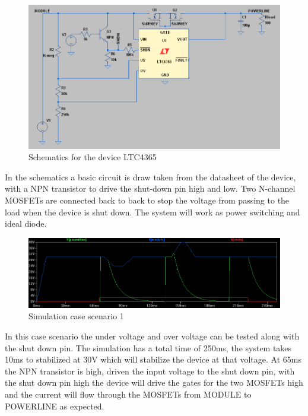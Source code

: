 \begin{figure}[H]
	\begin{centering}
		\includegraphics[width=1\textwidth]{images/tb5_LTC_simu1.png}
		\caption{Schematics for the device LTC4365}
	\end{centering}
\end{figure}
%
In the schematics a basic circuit is draw taken from the datasheet of the device, with a NPN transistor to drive the shut-down pin high and low. Two N-channel MOSFETs are connected back to back to  stop the voltage from passing to the load when the device is shut down. The system will work as power switching and ideal diode.
%
\begin{figure}[H]
	\begin{centering}
		\includegraphics[width=1\textwidth]{images/tb5_LTC_case1.png}
		\caption{Simulation case scenario 1}
	\end{centering}
\end{figure}
In this case scenario the under voltage and over voltage can be tested along with the shut down pin. The simulation has a total time of 250ms, the system takes 10ms to stabilized at 30V which will stabilize the device at that voltage. At 65ms the NPN transistor is high, driven the input voltage to the shut down pin, with the shut down pin high the device will drive the gates for the two MOSFETs high and the current will flow through the MOSFETs from MODULE to POWERLINE as expected. 
